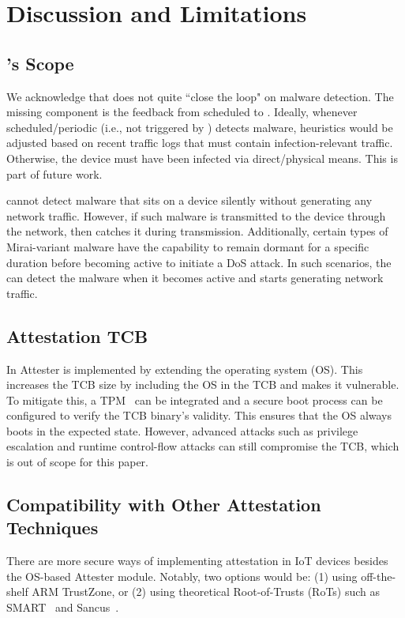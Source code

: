 \section{Discussion and Limitations} \label{sec:discussion}


\subsection{\system{}'s Scope}
We acknowledge that \system{} does not quite ``close the loop" on malware detection. The missing component is the feedback from scheduled \ra to \ta. Ideally, whenever scheduled/periodic  (i.e., not triggered by \ta) \ra{} detects malware, \ta heuristics would be adjusted based on recent traffic logs that must contain infection-relevant traffic. Otherwise, the device must have been infected via direct/physical
means. This is part of future work.

\system cannot detect malware that sits on a device silently without generating any network traffic. 
However, if such malware is transmitted to the device through the network, then \system catches it during transmission. 
Additionally, certain types of Mirai-variant malware have the capability to remain dormant for a specific duration before becoming active to initiate a DoS attack. 
In such scenarios, the \system can detect the malware when it becomes active and starts generating network traffic.
\subsection{Attestation TCB} \label{subsec:attestationtcb}
In \system Attester is implemented by extending the operating system (OS). This increases the TCB size by including the OS in the TCB and makes it vulnerable. 
To mitigate this, a TPM~\cite{tpm} can be integrated and a secure
boot process can be configured to verify the TCB binary’s
validity. This ensures that the OS always boots in the expected
state. However, advanced attacks such as privilege escalation
and runtime control-flow attacks can still compromise the
TCB, which is out of scope for this paper.

\subsection{Compatibility with Other Attestation Techniques}
There are more secure ways of implementing attestation in IoT devices besides the OS-based Attester module. 
Notably, two options would be: (1) using off-the-shelf ARM TrustZone, or (2) using theoretical Root-of-Trusts (RoTs) such as SMART~\cite{smart} and Sancus~\cite{sancus}.

